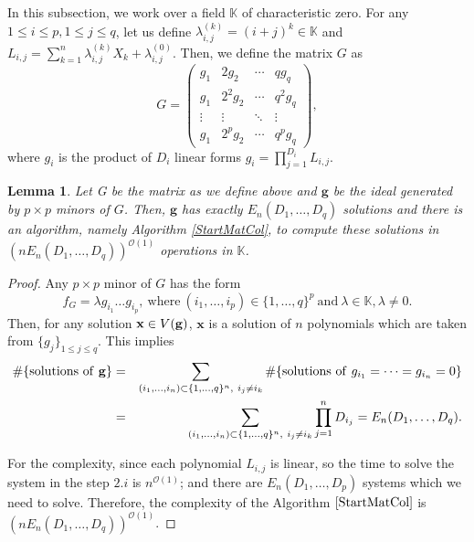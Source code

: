\documentclass[11pt]{article}
\numberwithin{Property}{section}
\numberwithin{Theorem}{section}
\numberwithin{Proposition}{section}
\newtheorem{Lemma}{Lemma}%
\numberwithin{Lemma}{section}
\numberwithin{Corollary}{section}
\numberwithin{Definition}{section}
\numberwithin{Remark}{section}
\numberwithin{Conjecture}{section}
\numberwithin{Problem}{section}
\numberwithin{Claim}{section}
\theoremstyle{definition}
\numberwithin{Example}{section}
\def\g {\ensuremath{\mathbf{g}}}
\renewcommand{\leq}{\leqslant}
\newcommand{\bigO}[1]{\mathcal{O}(#1)} %
\newcommand{\field}{\mathbb{K}} %
\begin{document}
In this subsection, we work over a field $\field$ of characteristic zero. For any $1 \leq i \leq p, 1 \leq j \leq q$, let us define $\lambda_{i,j}^{(k)}  = (i+j)^k \in \field$ and $L_{i,j} = \sum_{k = 1}^{n}\lambda_{i,j}^{(k)}X_k + \lambda_{i,j}^{(0)}$. Then, we define the matrix $G$ as
\[G = 
\left( \begin{matrix}
g_1 & 2g_2 & \cdots & qg_{q}\\
g_1 & 2^2g_2 & \cdots & q^2g_q\\
\vdots & \vdots & \ddots & \vdots \\
g_1 & 2^pg_2 & \cdots & q^pg_q
\end{matrix} \right),
\]
where $g_{i}$ is the product of $D_i$ linear forms $g_i = \prod_{j = 1}^{D_i}L_{i,j}$. 
\begin{Lemma} \label{G} Let G be the matrix as we define above and $\g$ be the ideal generated by $p \times p$ minors of $G$. Then, $\g$ has exactly $E_{n}(D_1, \ldots, D_q)$ solutions and there is an algorithm, namely Algorithm \ref{StartMatCol}, to compute these solutions in $(nE_{n}(D_1, \ldots, D_q))^{\bigO{1}}$ operations in $\field$.
\end{Lemma}
\begin{proof}
Any $p \times p$ minor of $G$ has the form 
\[
f_G = \lambda g_{i_1}\ldots g_{i_p}, \ \mathrm{where} \ (i_1, \ldots, i_p) \in \{1, \ldots,q\}^{p} \ \mathrm{and} \ \lambda \in \field, \lambda \ne 0.
\] Then, for any solution $\mathbf{x} \in V({\bf g})$, $\mathbf{x}$ is a solution of $n$ polynomials which are taken from $\{g_j\}_{1 \leq j \leq q}$. This implies 
\begin{eqnarray*}
\#\{\mathrm{solutions \ of \ } {\bf g} \} &=& \sum_{(i_1, \ldots, i_{n}) \subset \{1, \ldots,q\}^{n}, \ i_j \ne i_k} \#
\{\mathrm{solutions \ of \ }  g_{i_1} = \cdots = g_{i_{n}} = 0  \} \\
&=& \sum_{(i_1, \ldots, i_{n}) \subset \{1, \ldots,q\}^{n}, \ i_j \ne i_k}\prod_{j =1}^{n}D_{i_j} = E_{n}(D_1, \ldots, D_q). 
\end{eqnarray*}

For the complexity, since each polynomial $L_{i,j}$ is linear, so the time to solve the system in the step $2.i$ is $n^{\bigO{1}}$; and there are $E_{n}(D_1, \ldots, D_p)$ systems which we need to solve. Therefore, the complexity of the Algorithm $\ref{StartMatCol}$ is $(nE_{n}(D_1, \ldots, D_q))^{\bigO{1}}$.

\end{proof}
\end{document}
